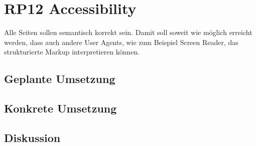 \section{RP12 Accessibility}
\label{sec:principle-rp12-accessibility}

Alle Seiten sollen semantisch korrekt sein. Damit soll soweit wie möglich erreicht werden, dass auch andere User Agents, wie zum Beispiel Screen Reader, das strukturierte Markup interpretieren können.

\subsection*{Geplante Umsetzung}


\subsection*{Konkrete Umsetzung}


\subsection*{Diskussion}
